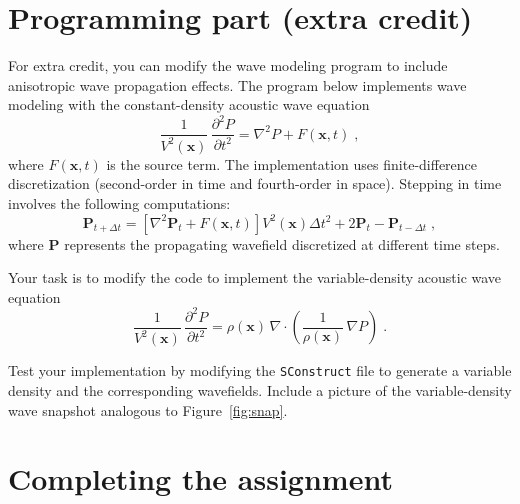 \lstset{language=python,numbers=left,numberstyle=\tiny,showstringspaces=false}


\section{Programming part (extra credit)}

For extra credit, you can modify the wave modeling program to include
anisotropic wave propagation effects. The program below implements
wave modeling with the constant-density acoustic wave equation
\begin{equation}
   {{\frac{1}{V^2(\mathbf{x})}}\,{\frac{\partial^2 P}{\partial t^2}}} =
   {\nabla^2 P} + {F(\mathbf{x},t)}\;,
   \label{eq:cdens}
\end{equation} 
where $F(\mathbf{x},t)$ is the source term. The implementation uses
finite-difference discretization (second-order in time and fourth-order in space). 
Stepping in time involves the following computations:
\begin{equation}
  \mathbf{P}_{t+\Delta t} = \left[ \nabla^2 \mathbf{P}_t + F(\mathbf{x},t)\right] V^2(\mathbf{x}) \Delta t^2 + 2 \mathbf{P}_{t} - \mathbf{P}_{t-\Delta t} \;,
  \label{eq:step}
\end{equation}
where $\mathbf{P}$ represents the propagating wavefield discretized at different time steps.

\lstset{language=c,numbers=left,numberstyle=\tiny,showstringspaces=false}


Your task is to modify the code to implement the variable-density acoustic wave equation
\begin{equation}
  {{\frac{1}{V^2(\mathbf{x})}}\,{\frac{\partial^2 P}{\partial t^2}}} =
  {\rho(\mathbf{x})\, \nabla \cdot 
  \left(\frac{1}{\rho(\mathbf{x})}\,\nabla P\right)}\;.
  \label{eq:vdens}
\end{equation} 

Test your implementation by modifying the \texttt{SConstruct} file to
generate a variable density and the corresponding wavefields. Include
a picture of the variable-density wave snapshot analogous to Figure~\ref{fig:snap}.

\section{Completing the assignment}

